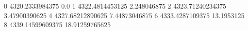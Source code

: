 0 4320.2333984375 0.0
1 4322.4814453125 2.248046875
2 4323.71240234375 3.47900390625
4 4327.68212890625 7.44873046875
6 4333.4287109375 13.1953125
8 4339.14599609375 18.91259765625
